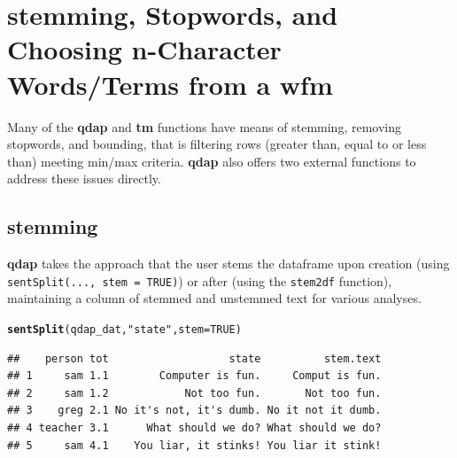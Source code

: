 \documentclass{article}\usepackage[]{graphicx}\usepackage[]{color}
\makeatletter
\newcommand{\hlnum}[1]{\textcolor[rgb]{0.686,0.059,0.569}{#1}}%
\newcommand{\hlstr}[1]{\textcolor[rgb]{0.192,0.494,0.8}{#1}}%
\newcommand{\hlstd}[1]{\textcolor[rgb]{0.345,0.345,0.345}{#1}}%
\newcommand{\hlkwc}[1]{\textcolor[rgb]{0.333,0.667,0.333}{#1}}%
\newcommand{\hlkwd}[1]{\textcolor[rgb]{0.737,0.353,0.396}{\textbf{#1}}}%
\newenvironment{kframe}{%
 \def\at@end@of@kframe{}%
 \ifinner\ifhmode%
  \def\at@end@of@kframe{\end{minipage}}%
  \begin{minipage}{\columnwidth}%
 \fi\fi%
 \def\FrameCommand##1{\hskip\@totalleftmargin \hskip-\fboxsep
 \colorbox{shadecolor}{##1}\hskip-\fboxsep
     \hskip-\linewidth \hskip-\@totalleftmargin \hskip\columnwidth}%
 \MakeFramed {\advance\hsize-\width
   \@totalleftmargin\z@ \linewidth\hsize
   \@setminipage}}%
 {\par\unskip\endMakeFramed%
 \at@end@of@kframe}
\newenvironment{knitrout}{}{} %
\makeatother
\begin{document}
\section{stemming, Stopwords, and Choosing n-Character Words/Terms from a wfm}


\hspace{.4cm} Many of the \textbf{qdap} and \textbf{tm} functions have means of stemming, removing stopwords, and bounding, that is filtering rows (greater than, equal to or less than) meeting min/max criteria.  \textbf{qdap} also offers two external functions to address these issues directly.  


\subsection{stemming}

\hspace{.4cm} \textbf{qdap} takes the approach that the user stems the dataframe upon creation (using \texttt{sentSplit(..., stem = TRUE)}) or after (using the \texttt{stem2df} function), maintaining a column of stemmed and unstemmed text for various analyses.

\begin{knitrout}
\color{fgcolor}\begin{kframe}
\begin{alltt}
\hlkwd{sentSplit}\hlstd{(qdap_dat,} \hlstr{"state"}\hlstd{,} \hlkwc{stem} \hlstd{=} \hlnum{TRUE}\hlstd{)}
\end{alltt}
\end{kframe}
\end{knitrout}


\begin{knitrout}
\color{fgcolor}\begin{kframe}
\begin{verbatim}
##    person tot                   state          stem.text
## 1     sam 1.1        Computer is fun.     Comput is fun.
## 2     sam 1.2            Not too fun.       Not too fun.
## 3    greg 2.1 No it's not, it's dumb. No it not it dumb.
## 4 teacher 3.1      What should we do? What should we do?
## 5     sam 4.1    You liar, it stinks! You liar it stink!
\end{verbatim}
\end{kframe}
\end{knitrout}
\end{document}
